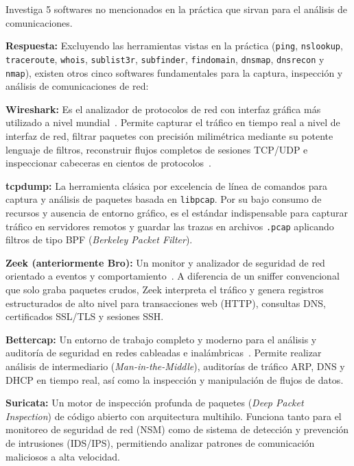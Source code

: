 Investiga 5 softwares no mencionados en la práctica que sirvan para el análisis de comunicaciones.

\textbf{Respuesta:}
Excluyendo las herramientas vistas en la práctica (\texttt{ping}, \texttt{nslookup}, \texttt{traceroute}, \texttt{whois}, \texttt{sublist3r}, \texttt{subfinder}, \texttt{findomain}, \texttt{dnsmap}, \texttt{dnsrecon} y \texttt{nmap}), existen otros cinco softwares fundamentales para la captura, inspección y análisis de comunicaciones de red:

\begin{enumerateColor}
    \item \textbf{Wireshark:} Es el analizador de protocolos de red con interfaz gráfica más utilizado a nivel mundial~\cite{wireshark_guide}. Permite capturar el tráfico en tiempo real a nivel de interfaz de red, filtrar paquetes con precisión milimétrica mediante su potente lenguaje de filtros, reconstruir flujos completos de sesiones TCP/UDP e inspeccionar cabeceras en cientos de protocolos~\cite{sanders_packet_analysis}.
    \item \textbf{tcpdump:} La herramienta clásica por excelencia de línea de comandos para captura y análisis de paquetes basada en \texttt{libpcap}. Por su bajo consumo de recursos y ausencia de entorno gráfico, es el estándar indispensable para capturar tráfico en servidores remotos y guardar las trazas en archivos \texttt{.pcap} aplicando filtros de tipo BPF (\textit{Berkeley Packet Filter}).
    \item \textbf{Zeek (anteriormente Bro):} Un monitor y analizador de seguridad de red orientado a eventos y comportamiento~\cite{zeek_ids}. A diferencia de un sniffer convencional que solo graba paquetes crudos, Zeek interpreta el tráfico y genera registros estructurados de alto nivel para transacciones web (HTTP), consultas DNS, certificados SSL/TLS y sesiones SSH.
    \item \textbf{Bettercap:} Un entorno de trabajo completo y moderno para el análisis y auditoría de seguridad en redes cableadas e inalámbricas~\cite{bettercap_framework}. Permite realizar análisis de intermediario (\textit{Man-in-the-Middle}), auditorías de tráfico ARP, DNS y DHCP en tiempo real, así como la inspección y manipulación de flujos de datos.
    \item \textbf{Suricata:} Un motor de inspección profunda de paquetes (\textit{Deep Packet Inspection}) de código abierto con arquitectura multihilo. Funciona tanto para el monitoreo de seguridad de red (NSM) como de sistema de detección y prevención de intrusiones (IDS/IPS), permitiendo analizar patrones de comunicación maliciosos a alta velocidad.
\end{enumerateColor}

